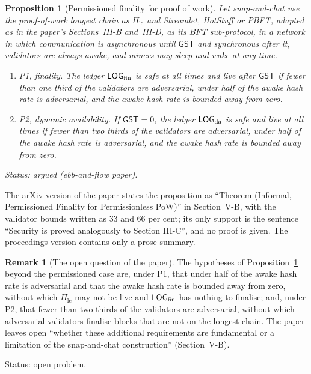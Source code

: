 \documentclass[11pt,a4paper]{article}
\newtheorem{proposition}[theorem]{Proposition}
\theoremstyle{definition}
\newtheorem{remark}[theorem]{Remark}
\newcommand{\Pilc}{\Pi_{\mathrm{lc}}}
\newcommand{\GST}{\mathsf{GST}}
\begin{document}
\begin{proposition}[Permissioned finality for proof of work]\label{prop:ntt-pow}
Let snap-and-chat use the proof-of-work longest chain as $\Pilc$ and
Streamlet, HotStuff or PBFT, adapted as in the paper's Sections~III-B
and~III-D, as its BFT sub-protocol, in a network in which communication is
asynchronous until $\GST$ and synchronous after it, validators are always awake,
and miners may sleep and wake at any time.
\begin{enumerate}[label=(\roman*)]
\item \emph{P1, finality.} The ledger $\LOGfin$ is safe at all times and
  live after $\GST$ if fewer than one third of the validators are
  adversarial, under half of the awake hash rate is adversarial, and the
  awake hash rate is bounded away from zero.
\item \emph{P2, dynamic availability.} If $\GST = 0$, the ledger $\LOGda$ is
  safe and live at all times if fewer than two thirds of the validators are
  adversarial, under half of the awake hash rate is adversarial, and the
  awake hash rate is bounded away from zero.
\end{enumerate}

Status: argued (ebb-and-flow paper).
\end{proposition}

The arXiv version of the paper states the proposition as ``Theorem
(Informal, Permissioned Finality for Permissionless PoW)'' in Section~V-B,
with the validator bounds written as 33 and 66 per cent; its only support is
the sentence ``Security is proved analogously to Section III-C'', and no
proof is given. The proceedings version contains only a prose summary.

\begin{remark}[The open question of the paper]\label{rem:ntt-open}
The hypotheses of Proposition~\ref{prop:ntt-pow} beyond the permissioned
case are, under P1, that under half of the awake hash rate is adversarial
and that the awake hash rate is bounded away from zero, without which
$\Pilc$ may not be live and $\LOGfin$ has nothing to finalise; and, under
P2, that fewer than two thirds of the validators are adversarial, without
which adversarial validators finalise blocks that are not on the longest
chain. The paper leaves open ``whether these additional requirements are
fundamental or a limitation of the snap-and-chat construction''
(Section~V-B).

Status: open problem.
\end{remark}
\end{document}
